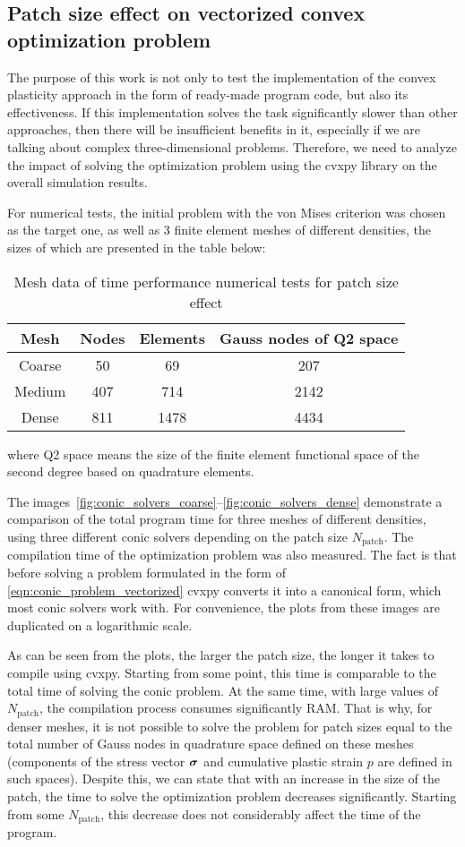\documentclass[12pt]{article}
\begin{document}
\subsection{Patch size effect on vectorized convex optimization problem}
The purpose of this work is not only to test the implementation of the convex plasticity approach in the form of ready-made program code, but also its effectiveness. If this implementation solves the task significantly slower than other approaches, then there will be insufficient benefits in it, especially if we are talking about complex three-dimensional problems. Therefore, we need to analyze the impact of solving the optimization problem using the cvxpy library on the overall simulation results. 

For numerical tests, the initial problem with the von Mises criterion was chosen as the target one, as well as 3 finite element meshes of different densities, the sizes of which are presented in the table below:

\begin{table}[H]
	\centering
	\begin{tabular}{|cccc|}
		\hline
		Mesh & Nodes & Elements & Gauss nodes of Q2 space \\
		\hline
		Coarse & 50	& 69 & 207 \\
		Medium & 407 & 714 & 2142 \\
		Dense & 811	& 1478 & 4434 \\
		\hline
	\end{tabular}
	\caption{Mesh data of time performance numerical tests for patch size effect}
    \label{tab:cvxpy_tests}
\end{table}
where Q2 space means the size of the finite element functional space of the second degree based on quadrature elements.

The images~\ref{fig:conic_solvers_coarse}--\ref{fig:conic_solvers_dense} demonstrate a comparison of the total program time for three meshes of different densities, using three different conic solvers depending on the patch size $N_\text{patch}$. The compilation time of the optimization problem was also measured. The fact is that before solving a problem formulated in the form of \eqref{eqn:conic_problem_vectorized} cvxpy converts it into a canonical form, which most conic solvers work with. For convenience, the plots from these images are duplicated on a logarithmic scale.

As can be seen from the plots, the larger the patch size, the longer it takes to compile using cvxpy. Starting from some point, this time is comparable to the total time of solving the conic problem. At the same time, with large values of $N_\text{patch}$, the compilation process consumes significantly RAM. That is why, for denser meshes, it is not possible to solve the problem for patch sizes equal to the total number of Gauss nodes in quadrature space defined on these meshes (components of the stress vector $\mbox{\boldmath$\sigma$}$ and cumulative plastic strain $p$ are defined in such spaces). Despite this, we can state that with an increase in the size of the patch, the time to solve the optimization problem decreases significantly. Starting from some $N_\text{patch}$, this decrease does not considerably affect the time of the program.
\end{document}

